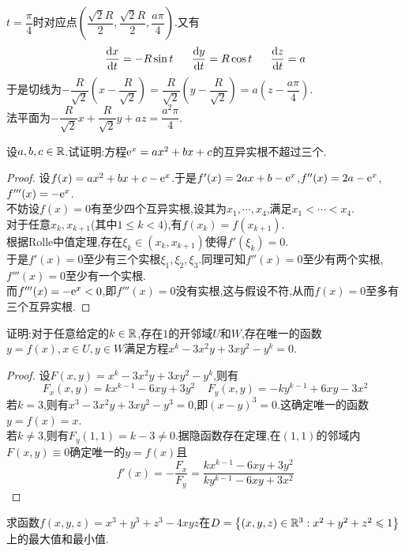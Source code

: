 \documentclass{ctexart}
\begin{document}
\begin{solution}
    $t=\dfrac{\pi}{4}$时对应点$\left(\dfrac{\sqrt2R}{2},\dfrac{\sqrt2R}{2},\dfrac{a\pi}{4}\right)$.又有
    \[\dfrac{\di x}{\di t}=-R\sin t\ \ \ \ \ \dfrac{\di y}{\di t}=R\cos t\ \ \ \ \ \dfrac{\di z}{\di t}=a\]
    于是切线为$-\dfrac{R}{\sqrt2}\left(x-\dfrac{R}{\sqrt2}\right)=\dfrac{R}{\sqrt2}\left(y-\dfrac{R}{\sqrt2}\right)=a\left(z-\dfrac{a\pi}{4}\right)$.\\
    法平面为$-\dfrac{R}{\sqrt2}x+\dfrac{R}{\sqrt2}y+az=\dfrac{a^2\pi}{4}$.
\end{solution}
\begin{problem}[6.(10\songti{分})]
    设$a,b,c\in\mathbb{R}$.试证明:方程$\mathrm{e}^x=ax^2+bx+c$的互异实根不超过三个.
\end{problem}
\begin{proof}
    设$f(x)=ax^2+bx+c-\mathrm{e}^x$.于是$f'(x)=2ax+b-\mathrm{e}^x$,$f''(x)=2a-\mathrm{e}^x$,$f'''(x)=-\mathrm{e}^x$.\\
    不妨设$f(x)=0$有至少四个互异实根,设其为$x_1,\cdots,x_4$,满足$x_1<\cdots<x_4$.\\
    对于任意$x_k,x_{k+1}$(其中$1\leqslant k<4$),有$f(x_k)=f(x_{k+1})$.\\
    根据Rolle中值定理,存在$\xi_k\in(x_k,x_{k+1})$使得$f'(\xi_k)=0$.\\
    于是$f'(x)=0$至少有三个实根$\xi_1,\xi_2,\xi_3$.同理可知$f''(x)=0$至少有两个实根,$f'''(x)=0$至少有一个实根.\\
    而$f'''(x)=-\mathrm{e}^x<0$,即$f'''(x)=0$没有实根,这与假设不符,从而$f(x)=0$至多有三个互异实根.
\end{proof}
\begin{problem}[7.(10\songti{分})]
    证明:对于任意给定的$k\in\mathbb{R}$,存在$1$的开邻域$U$和$W$,存在唯一的函数$y=f(x),x\in U,y\in W$满足方程$x^k-3x^2y+3xy^2-y^k=0$.
\end{problem}
\begin{proof}
    设$F(x,y)=x^k-3x^2y+3xy^2-y^k$,则有
    \[F_x(x,y)=kx^{k-1}-6xy+3y^2\ \ \ \ \ F_y(x,y)=-ky^{k-1}+6xy-3x^2\]
    若$k=3$,则有$x^3-3x^2y+3xy^2-y^3=0$,即$(x-y)^3=0$.这确定唯一的函数$y=f(x)=x$.\\
    若$k\neq3$,则有$F_y(1,1)=k-3\neq0$.据隐函数存在定理,在$(1,1)$的邻域内$F(x,y)\equiv0$确定唯一的$y=f(x)$且
    \[f'(x)=-\dfrac{F_x}{F_y}=\dfrac{kx^{k-1}-6xy+3y^2}{ky^{k-1}-6xy+3x^2}\]
\end{proof}
\begin{problem}[8.(15\songti{分})]
    求函数$f(x,y,z)=x^3+y^3+z^3-4xyz$在$D=\left\{(x,y,z)\in\mathbb{R}^3:x^2+y^2+z^2\leqslant1\right\}$上的最大值和最小值.
\end{problem}
\end{document}
